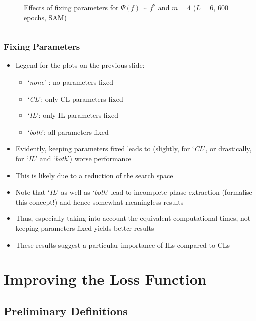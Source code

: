 \documentclass{beamer}
\begin{document}
\begin{frame}
\begin{columns}
\begin{column}{0.5\textwidth}
\begin{figure}
\caption{Effects of fixing parameters for $\Psi(f) \sim f^2$ and $m=4$ ($L=6$, 600 epochs, SAM)}
\end{figure}
\end{column}
\end{columns}
\end{frame}

\begin{frame}
\frametitle{Fixing Parameters}
\begin{itemize}
\item Legend for the plots on the previous slide:
\begin{itemize}
\item `\emph{none}' : no parameters fixed 
\item `\emph{CL}': only CL parameters fixed
\item `\emph{IL}': only IL parameters fixed 
\item `\emph{both}': all parameters fixed  
\end{itemize} 
\item Evidently, keeping parameters fixed leads to (slightly, for `\emph{CL}', or drastically, for `\emph{IL}' and `\emph{both}') \alert{worse performance} 
\item This is likely due to a reduction of the search space 
\item Note that `\emph{IL}' as well as `\emph{both}' lead to \alert{incomplete phase extraction} (formalise this concept!) and hence somewhat meaningless results 
\item Thus, especially taking into account the equivalent computational times, \alert{not keeping parameters fixed yields better results} 
\item These results suggest a particular importance of ILs compared to CLs 
\end{itemize}
\end{frame}

\section{Improving the Loss Function}

\subsection{Preliminary Definitions}
\end{document}
